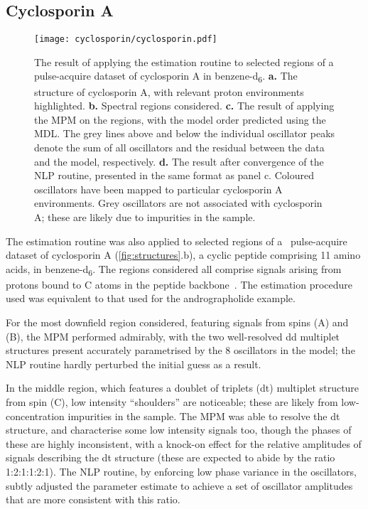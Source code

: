 \subsection{Cyclosporin A}
\label{subsec:cyclo}
\begin{figure}
    \texttt{[image: cyclosporin/cyclosporin.pdf]}
    \caption[
        The result of applying the estimation routine to selected regions of a
        pulse-acquire dataset of cyclosporin A.
    ]{
        The result of applying the estimation routine to selected regions of a
        pulse-acquire dataset of cyclosporin A in benzene-d\textsubscript{6}.
        \textbf{a.} The structure of cyclosporin A, with relevant proton
        environments highlighted.
        \textbf{b.} Spectral regions considered.
        \textbf{c.} The result of applying the \acs{MPM} on the regions, with
        the model order predicted using the \acs{MDL}.
        The grey lines above and below the individual oscillator peaks denote
        the sum of all oscillators and the residual between the data and the
        model, respectively.
        \textbf{d.} The result after convergence of the \acs{NLP} routine,
        presented in the same format as panel c.
        Coloured oscillators have been mapped to particular cyclosporin A
        environments. Grey oscillators are not associated with
        cyclosporin A; these are likely due to impurities in the sample.
    }
    \label{fig:cyclosporin}
\end{figure}
The estimation routine was also applied to selected regions of a
\proton\ pulse-acquire dataset of cyclosporin A
(\cref{fig:structures}.b), a cyclic peptide comprising 11 amino
acids, in benzene-d\textsubscript{6}.
The regions considered all comprise
signals arising from protons bound to C\textsuperscript{\textalpha} atoms in
the peptide backbone~\cite{Verma2018}.
The estimation procedure used was equivalent to
that used for the andrographolide example.

For the most downfield region
considered, featuring signals from spins (A) and (B), the \ac{MPM} performed
admirably, with the two well-resolved dd multiplet structures present
accurately parametrised by the 8 oscillators in the model; the \ac{NLP} routine
hardly perturbed the initial guess as a result.

In the middle region, which features a doublet of triplets (dt) multiplet structure
from spin (C), low intensity ``shoulders'' are noticeable;
these are likely from low-concentration impurities in the sample. The \ac{MPM}
was able to resolve the dt structure, and characterise
some low intensity signals too, though the phases of these are highly
inconsistent, with a knock-on effect for the relative amplitudes of signals
describing the dt structure (these are expected to abide by the ratio
1:2:1:1:2:1). The \ac{NLP} routine, by enforcing low phase variance in the
oscillators, subtly adjusted the parameter estimate to achieve a set of
oscillator amplitudes that are more consistent with this ratio.

